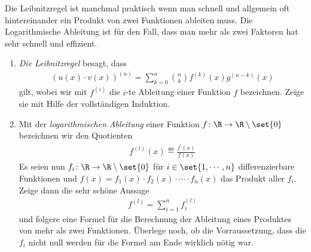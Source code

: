 \begin{exercise}
  Die Leibnitzregel ist manchmal praktisch wenn man schnell und allgemein oft
  hintereinander ein Produkt von zwei Funktionen ableiten muss. Die
  Logarithmische Ableitung ist für den Fall, dass man mehr als zwei Faktoren hat
  sehr schnell und effizient.
  \begin{enumerate}[label=(\alph*)]
  \item \emph{Die Leibnitzregel} besagt, dass
    \begin{equation*}
      \begin{split}
        \left(u(x) \cdot v(x)\right)^{(n)} = \sum_{k=0}^{n} { \binom{n}{k}
          f^{(k)}(x) g^{(n-k)}(x) }
      \end{split}
    \end{equation*}
    gilt, wobei wir mit $f^{(i)}$ die $i$-te Ableitung einer Funktion $f$
    bezeichnen. Zeige sie mit Hilfe der vollständigen Induktion.
  \item Mit der \emph{logarithmischen Ableitung} einer Funktion
    $f \colon \R \to \R \setminus \set{0}$ bezeichnen wir den Quotienten
    \begin{equation*}
      \begin{split}
        f^{(l)}(x) \eqdef \frac{f^\prime(x)}{f(x)}
      \end{split}
    \end{equation*}
    Es seien nun $f_i\colon \R \to \R \setminus \set{0}$ für
    $i \in \set{1, \cdots, n}$ differenzierbare Funktionen und
    $f(x) = f_1(x) \cdot f_2(x) \cdot \cdots \cdot f_n(x)$ das Produkt aller
    $f_i$. Zeige dann die sehr schöne Aussage
    \begin{equation*}
      \begin{split}
        f^{(l)} = \sum\limits_{ i=1 }^{ n }{ f_i^{(l)} }
      \end{split}
    \end{equation*}
    und folgere eine Formel für die Berechnung der Ableitung eines Produktes von
    mehr als zwei Funktionen. Überlege noch, ob die Vorraussetzung, dass die
    $f_i$ nicht null werden für die Formel am Ende wirklich nötig war.
  \end{enumerate}
\end{exercise}
